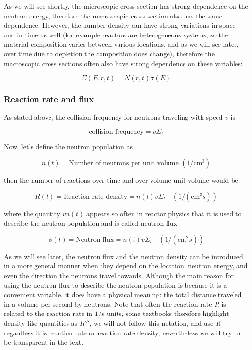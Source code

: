 As we will see shortly, the microscopic cross section has strong dependence on the neutron energy, therefore the macroscopic cross section also has the same dependence. However, the number density can have strong variations in space and in time as well (for example reactors are heterogeneous systems, so the material composition varies between various locations, and as we will see later, over time due to depletion the composition does change), therefore the macroscopic cross sections often also have strong dependence on these variables:

\[
\Sigma (E, r, t)=N(r,t)\sigma (E)
\]

\subsubsection{Reaction rate and flux}

As stated above, the collision frequency for neutrons traveling with speed $v$ is 

\begin{equation}
\text{collision frequency}=v\Sigma_t
\end{equation}

\noindent Now, let's define the neutron population as 

\begin{equation}
n(t)=\text{Number of neutrons per unit volume }(1/\text{cm}^3)
\end{equation}

\noindent then the number of reactions over time and over volume unit volume would be

\begin{equation}
R(t)=\text{Reaction rate density}=n(t)v\Sigma_t \quad (1/(\text{cm}^3s))
\end{equation}

\noindent where the quantity $vn(t)$ appears so often in reactor physics that it is used to describe the neutron population and is called neutron flux

\begin{equation}
\phi(t)=\text{Neutron flux}=n(t)v\Sigma_t \quad (1/(\text{cm}^2s))
\end{equation}

As we will see later, the neutron flux and the neutron density can be introduced in a more general manner when they depend on the location, neutron energy, and even the direction the neutrons travel towards. Although the main reason for using the neutron flux to describe the neutron population is because it is a convenient variable, it does have a physical meaning: the total distance traveled in a volume per second by neutrons. Note that often the reaction rate $R$ is related to the reaction rate in $1/s$ units, some textbooks therefore highlight density like quantities as $R'''$, we will not follow this notation, and use $R$ regardless it is reaction rate or reaction rate density, nevertheless we will try to be transparent in the text.


